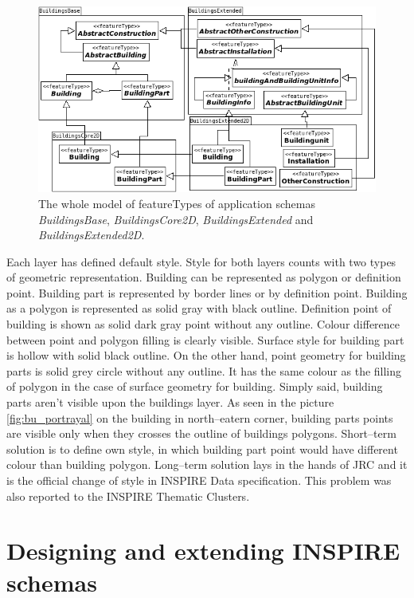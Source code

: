 \documentclass[eprint]{actapoly}
\begin{document}
\begin{figure}
\centering
\includegraphics[width=0.8\linewidth]{pics/Buildings.png} %
\caption{The whole model of featureTypes of application schemas \textit{BuildingsBase}, \textit{BuildingsCore2D}, \textit{BuildingsExtended} and \textit{BuildingsExtended2D}.}
\label{fig:bu_features}
\end{figure}

Each layer has defined default style. Style for both layers counts with two types of geometric representation. Building can be represented as polygon or definition point. Building part is represented by border lines or by definition point. Building as a polygon is represented as solid gray with black outline. Definition point of building is shown as solid dark gray point without any outline. Colour difference between point and polygon filling is clearly visible. Surface style for building part is hollow with solid black outline. On the other hand, point geometry for building parts is solid grey circle without any outline. It has the same colour as the filling of polygon in the case of surface geometry for building. Simply said, building parts aren't visible upon the buildings layer. As seen in the picture \ref{fig:bu_portrayal} on the building in north--eatern corner, building parts points are visible only when they crosses the outline of buildings polygons. Short--term solution is to define own style, in which building part point would have different colour than building polygon. Long--term solution lays in the hands of JRC and it is the official change of style in INSPIRE Data specification. This problem was also reported to the INSPIRE Thematic Clusters.

\section{Designing and extending INSPIRE schemas}
\label{sec:extending}
\end{document}
